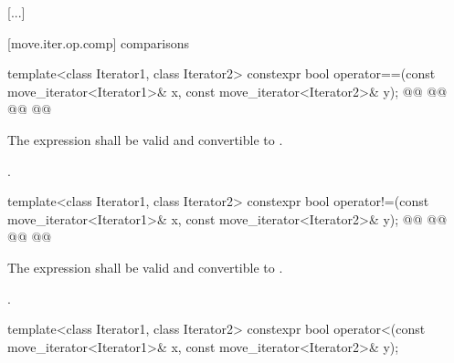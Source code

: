 [...]

[move.iter.op.comp]{ comparisons}

%
\begin{itemdecl}
template<class Iterator1, class Iterator2>
constexpr bool operator==(const move_iterator<Iterator1>& x, const move_iterator<Iterator2>& y);
@@
@@
@@
@@
\end{itemdecl}

\begin{itemdescr}
\begin{addedblock}
\pnum
\constraints
The expression  shall be valid and
convertible to .
\end{addedblock}

\pnum
\returns {}.
\end{itemdescr}

%
\begin{itemdecl}
template<class Iterator1, class Iterator2>
constexpr bool operator!=(const move_iterator<Iterator1>& x, const move_iterator<Iterator2>& y);
@@
@@
@@
@@
\end{itemdecl}

\begin{itemdescr}
\begin{addedblock}
\pnum
\constraints
The expression  shall be valid and
convertible to .
\end{addedblock}

\pnum
\returns {}.
\end{itemdescr}

%
\begin{itemdecl}
template<class Iterator1, class Iterator2>
constexpr bool operator<(const move_iterator<Iterator1>& x, const move_iterator<Iterator2>& y);
\end{itemdecl}

